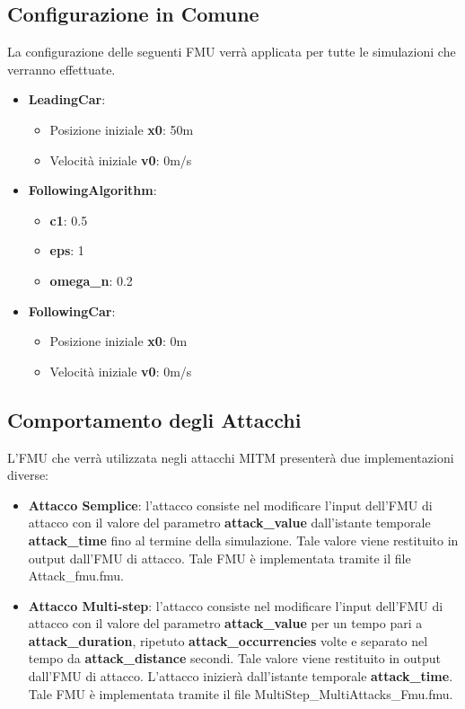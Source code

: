 \subsection{Configurazione in Comune}
La configurazione delle seguenti FMU verrà applicata per tutte le simulazioni che verranno effettuate.
\begin{itemize}
	\item \textbf{LeadingCar}:
	\begin{itemize}
		\item Posizione iniziale \textbf{x0}: 50m
		\item Velocità iniziale \textbf{v0}: 0m/s
	\end{itemize}
	
	\item \textbf{FollowingAlgorithm}:
	\begin{itemize}
		\item \textbf{c1}: 0.5
		\item \textbf{eps}: 1
		\item \textbf{omega\_n}: 0.2
	\end{itemize}
	
	
	\item \textbf{FollowingCar}:
	\begin{itemize}
		\item Posizione iniziale \textbf{x0}: 0m
		\item Velocità iniziale \textbf{v0}: 0m/s
	\end{itemize}
\end{itemize}

\subsection{Comportamento degli Attacchi}
L'FMU che verrà utilizzata negli attacchi MITM presenterà due implementazioni diverse:
\begin{itemize}
\item \textbf{Attacco Semplice}: l'attacco consiste nel modificare l'input dell'FMU di attacco con il valore del parametro \textbf{attack\_value} dall'istante temporale \textbf{attack\_time} fino al termine della simulazione. Tale valore viene restituito in output dall'FMU di attacco. Tale FMU è implementata tramite il file Attack\_fmu.fmu.
\item \textbf{Attacco Multi-step}: l'attacco consiste nel modificare l'input dell'FMU di attacco con il valore del parametro \textbf{attack\_value} per un tempo pari a \textbf{attack\_duration}, ripetuto \textbf{attack\_occurrencies} volte e separato nel tempo da \textbf{attack\_distance} secondi. Tale valore viene restituito in output dall'FMU di attacco. L'attacco inizierà dall'istante temporale \textbf{attack\_time}. Tale FMU è implementata tramite il file MultiStep\_MultiAttacks\_Fmu.fmu.

\end{itemize}
